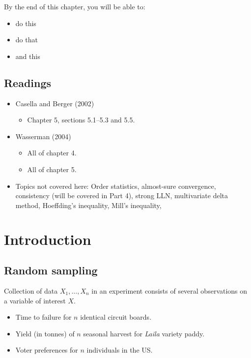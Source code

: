 \documentclass[
]{book}
\providecommand{\tightlist}{%
  \setlength{\itemsep}{0pt}\setlength{\parskip}{0pt}}
\theoremstyle{definition}
\theoremstyle{definition}
\theoremstyle{definition}
\theoremstyle{definition}
\theoremstyle{remark}
\begin{document}
By the end of this chapter, you will be able to:

\begin{itemize}
\tightlist
\item
  do this
\item
  do that
\item
  and this
\end{itemize}

\hypertarget{readings-2}{%
\subsection*{Readings}\label{readings-2}}

\begin{itemize}
\tightlist
\item
  Casella and Berger (2002)

  \begin{itemize}
  \tightlist
  \item
    Chapter 5, sections 5.1--5.3 and 5.5.
  \end{itemize}
\item
  Wasserman (2004)

  \begin{itemize}
  \tightlist
  \item
    All of chapter 4.
  \item
    All of chapter 5.
  \end{itemize}
\item
  Topics not covered here: Order statistics, almost-sure convergence, consistency (will be covered in Part 4), strong LLN, multivariate delta method, Hoeffding's inequality, Mill's inequality,
\end{itemize}

\hypertarget{introduction}{%
\section{Introduction}\label{introduction}}

\hypertarget{random-sampling}{%
\subsection{Random sampling}\label{random-sampling}}

Collection of data \(X_1,\dots,X_n\) in an experiment consists of several observations on a variable of interest \(X\).

\begin{itemize}
\tightlist
\item
  Time to failure for \(n\) identical circuit boards.
\item
  Yield (in tonnes) of \(n\) seasonal harvest for \emph{Laila} variety paddy.
\item
  Voter preferences for \(n\) individuals in the US.
\end{itemize}
\end{document}
